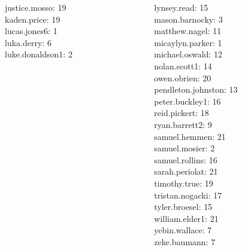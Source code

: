 \documentclass[10pt]{beamer}
\begin{document}
\begin{frame}
\begin{columns}
\begin{column}{0.33\textwidth}
justice.mosso: 19 \\ 
kaden.price: 19 \\ 
lucas.jones6: 1 \\ 
luka.derry: 6 \\ 
luke.donaldson1: 2 \\\end{column}
\begin{column}{0.33\textwidth}
lynsey.read: 15 \\ 
mason.barnocky: 3 \\ 
matthew.nagel: 11 \\ 
micaylyn.parker: 1 \\ 
michael.oswald: 12 \\ 
nolan.scott1: 14 \\ 
owen.obrien: 20 \\ 
pendleton.johnston: 13 \\ 
peter.buckley1: 16 \\ 
reid.pickert: 18 \\ 
ryan.barrett2: 9 \\ 
samuel.hemmen: 21 \\ 
samuel.mosier: 2 \\ 
samuel.rollins: 16 \\ 
sarah.periolat: 21 \\ 
timothy.true: 19 \\ 
tristan.nogacki: 17 \\ 
tyler.broesel: 15 \\ 
william.elder1: 21 \\ 
yebin.wallace: 7 \\ 
zeke.baumann: 7 \\\end{column}
\end{columns}
\vfill
\end{frame}
\end{document}
